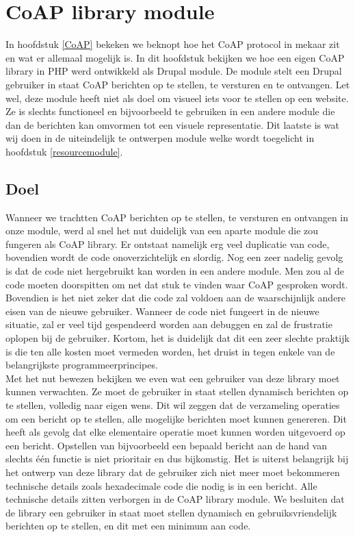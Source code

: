 \chapter{CoAP library module}

In hoofdstuk \ref{CoAP} bekeken we beknopt hoe het CoAP protocol in mekaar zit en wat er allemaal mogelijk is. In dit hoofdstuk bekijken we hoe een eigen CoAP library in PHP werd ontwikkeld als Drupal module. De module stelt een Drupal gebruiker in staat CoAP berichten op te stellen, te versturen en te ontvangen. Let wel, deze module heeft niet als doel om visueel iets voor te stellen op een website. Ze is slechts functioneel en bijvoorbeeld te gebruiken in een andere module die dan de berichten kan omvormen tot een visuele representatie. Dit laatste is wat wij doen in de uiteindelijk te ontwerpen module welke wordt toegelicht in hoofdstuk \ref{resourcemodule}.

\section{Doel}

Wanneer we trachtten CoAP berichten op te stellen, te versturen en ontvangen in onze module, werd al snel het nut duidelijk van een aparte module die zou fungeren als CoAP library. Er ontstaat namelijk erg veel duplicatie van code, bovendien wordt de code onoverzichtelijk en slordig. Nog een zeer nadelig gevolg is dat de code niet hergebruikt kan worden in een andere module. Men zou al de code moeten doorspitten om net dat stuk te vinden waar CoAP gesproken wordt. Bovendien is het niet zeker dat die code zal voldoen aan de waarschijnlijk andere eisen van de nieuwe gebruiker. Wanneer de code niet fungeert in de nieuwe situatie, zal er veel tijd gespendeerd worden aan debuggen en zal de frustratie oplopen bij de gebruiker. Kortom, het is duidelijk dat dit een zeer slechte praktijk is die ten alle kosten moet vermeden worden, het druist in tegen enkele van de belangrijkste programmeerprincipes.\\

Met het nut bewezen bekijken we even wat een gebruiker van deze library moet kunnen verwachten. Ze moet de gebruiker in staat stellen dynamisch berichten op te stellen, volledig naar eigen wens. Dit wil zeggen dat de verzameling operaties om een bericht op te stellen, alle mogelijke berichten moet kunnen genereren. Dit heeft als gevolg dat elke elementaire operatie moet kunnen worden uitgevoerd op een bericht. Opstellen van bijvoorbeeld een bepaald bericht aan de hand van slechts één functie is niet prioritair en dus bijkomstig. Het is uiterst belangrijk bij het ontwerp van deze library dat de gebruiker zich niet meer moet bekommeren technische details zoals hexadecimale code die nodig is in een bericht. Alle technische details zitten verborgen in de CoAP library module. We besluiten dat de library een gebruiker in staat moet stellen dynamisch en gebruiksvriendelijk berichten op te stellen, en dit met een minimum aan code.

